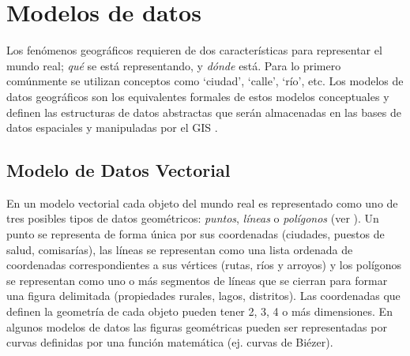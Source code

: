 
%	


\section{Modelos de datos}

Los fenómenos geográficos requieren de dos características para representar el mundo real; \emph{qué} se está representando, y \emph{dónde} está. Para lo primero comúnmente se utilizan conceptos como `ciudad', `calle', `río', etc. Los modelos de datos geográficos son los equivalentes formales de estos modelos conceptuales y definen las estructuras de datos abstractas que serán almacenadas en las bases de datos espaciales y manipuladas por el GIS \citep{burrough1998principles}.

\subsection{Modelo de Datos Vectorial}

En un modelo vectorial cada objeto del mundo real es representado como uno de tres posibles tipos de datos geométricos: \emph{puntos}, \emph{líneas} o \emph{polígonos} (ver ). Un punto se representa de forma única por sus coordenadas (ciudades, puestos de salud, comisarías), las líneas se representan como una lista ordenada de coordenadas correspondientes a sus vértices (rutas, ríos y arroyos) y los polígonos se representan como uno o más segmentos de líneas que se cierran para formar una figura delimitada (propiedades rurales, lagos, distritos). Las coordenadas que definen la geometría de cada objeto pueden tener 2, 3, 4 o más dimensiones. En algunos modelos de datos las figuras geométricas pueden ser representadas por curvas definidas por una función matemática (ej. curvas de Biézer).

